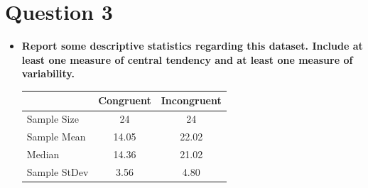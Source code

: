 \documentclass[a4paper,11pt]{report}
\begin{document}
\section{Question 3}
  \begin{itemize}
    \item \textbf{Report some descriptive statistics regarding this dataset.  Include at least one measure of central tendency and at least one measure of variability.}\\
    \begin{center}
      \begin{tabular}{|| l c c ||}
      \hline
      & Congruent & Incongruent \\
      \hline\hline
      Sample Size & 24 & 24 \\
      \hline
      Sample Mean & 14.05 & 22.02 \\
      \hline
      Median & 14.36 & 21.02 \\
      \hline
      Sample StDev & 3.56 & 4.80 \\
      \hline
      \end{tabular}
    \end{center}
  \end{itemize}
  
\end{document}
